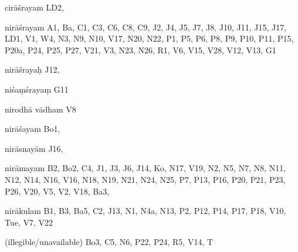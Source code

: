 \begin{ekdosis}
\begin{marma}[hp01_055]
\begin{marma}[hp02_009]
\begin{marma}[hp02_011]
 \begin{marma}[hp02_40b]
\item[cirāśrayam] LD2,
\item[nirāśrayam] A1, Ba, C1, C3, C6, C8, C9, J2, J4, J5, J7, J8, J10, J11, J15, J17, LD1, V1, W4, N3, N9, N10, V17, N20, N22, P1, P5, P6, P8, P9, P10, P11, P15, P20a, P24, P25, P27, V21, V3, N23, N26, R1, V6, V15, V28, V12, V13, G1
\item[nirāśrayaḥ] J12,
\item[niśaṃśrayaṃ] G11
\item[nirodhā vādham] V8
\item[nirāśayam] Bo1,
\item[nirāsnayām] J16,
\item[nirāmayam] B2, Bo2, C4, J1, J3, J6, J14, Ko, N17, V19, N2, N5, N7, N8, N11, N12, N14, N16, V16, N18, N19, N21, N24, N25, P7, P13, P16, P20, P21, P23, P26, V20, V5, V2, V18, Ba3,
\item[nirākulam] B1, B3, Ba5, C2, J13, N1, N4a, N13, P2, P12, P14, P17, P18, V10, Tue, V7, V22
\item[(illegible/unavailable)] Bo3, C5, N6, P22, P24, R5, V14, T
  \begin{description}

    \end{description}
 \end{marma}


\end{marma}
\end{marma}
\end{marma}
\end{ekdosis}
